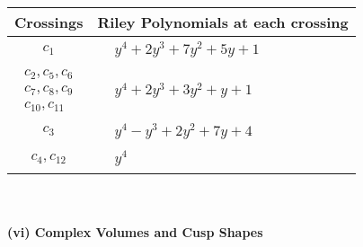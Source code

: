 \documentclass[1p]{elsarticle_modified}
\theoremstyle{definition}
\begin{document}
\begin{tabular}{m{50pt}|m{274pt}}
Crossings & \hspace{64pt}Riley Polynomials at each crossing \\
\hline $$\begin{aligned}c_{1}\end{aligned}$$&$\begin{aligned}
&y^4+2 y^3+7 y^2+5 y+1
\end{aligned}$\\
\hline $$\begin{aligned}c_{2},c_{5},c_{6}\\c_{7},c_{8},c_{9}\\c_{10},c_{11}\end{aligned}$$&$\begin{aligned}
&y^4+2 y^3+3 y^2+y+1
\end{aligned}$\\
\hline $$\begin{aligned}c_{3}\end{aligned}$$&$\begin{aligned}
&y^4- y^3+2 y^2+7 y+4
\end{aligned}$\\
\hline $$\begin{aligned}c_{4},c_{12}\end{aligned}$$&$\begin{aligned}
&y^4
\end{aligned}$\\
\hline
\end{tabular}\\~\\
\newpage\flushleft \textbf{(vi) Complex Volumes and Cusp Shapes}
\end{document}
